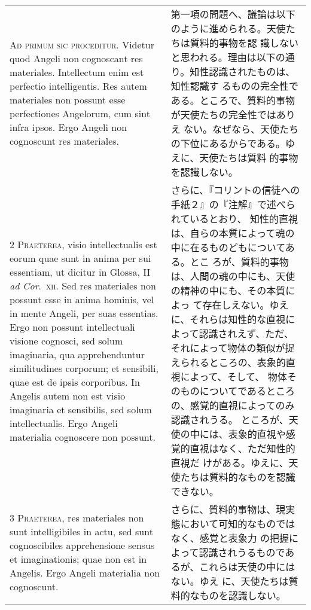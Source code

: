 \documentclass[10pt]{jsarticle} %
\begin{document}
\begin{longtable}{p{21em}p{21em}}


{\huge A}{\scshape d primum sic proceditur}. Videtur quod Angeli non
cognoscant res materiales. Intellectum enim est perfectio
intelligentis. Res autem materiales non possunt esse perfectiones
Angelorum, cum sint infra ipsos. Ergo Angeli non cognoscunt res
materiales.

&

第一項の問題へ、議論は以下のように進められる。天使たちは質料的事物を認
識しないと思われる。理由は以下の通り。知性認識されたものは、知性認識す
るものの完全性である。ところで、質料的事物が天使たちの完全性ではありえ
ない。なぜなら、天使たちの下位にあるからである。ゆえに、天使たちは質料
的事物を認識しない。

\\


{\scshape 2 Praeterea}, visio intellectualis est eorum quae sunt in
anima per sui essentiam, ut dicitur in Glossa, II {\itshape ad
Cor}.~{\scshape xii}. Sed res materiales non possunt esse in anima
hominis, vel in mente Angeli, per suas essentias. Ergo non possunt
intellectuali visione cognosci, sed solum imaginaria, qua
apprehenduntur similitudines corporum; et sensibili, quae est de ipsis
corporibus. In Angelis autem non est visio imaginaria et sensibilis,
sed solum intellectualis. Ergo Angeli materialia cognoscere non
possunt.


&


さらに、『コリントの信徒への手紙２』の『注解』で述べられているとおり、
知性的直視は、自らの本質によって魂の中に在るものどもについてある。とこ
ろが、質料的事物は、人間の魂の中にも、天使の精神の中にも、その本質によっ
て存在しえない。ゆえに、それらは知性的な直視によって認識されえず、ただ、
それによって物体の類似が捉えられるところの、表象的直視によって、そして、
物体そのものについてであるところの、感覚的直視によってのみ認識されうる。
ところが、天使の中には、表象的直視や感覚的直視はなく、ただ知性的直視だ
けがある。ゆえに、天使たちは質料的なものを認識できない。

\\


{\scshape 3 Praeterea}, res materiales non sunt intelligibiles in
actu, sed sunt cognoscibiles apprehensione sensus et imaginationis;
quae non est in Angelis. Ergo Angeli materialia non cognoscunt.


&

さらに、質料的事物は、現実態において可知的なものではなく、感覚と表象力
の把握によって認識されうるものであるが、これらは天使の中にはない。ゆえ
に、天使たちは質料的なものを認識しない。


\end{longtable}
\end{document}
